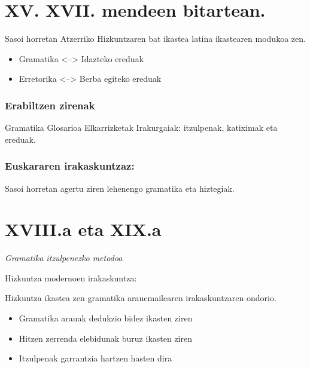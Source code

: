 \documentclass[
]{book}
\providecommand{\tightlist}{%
  \setlength{\itemsep}{0pt}\setlength{\parskip}{0pt}}
\begin{document}
\hypertarget{xv.-xvii.-mendeen-bitartean.}{%
\section{XV. XVII. mendeen bitartean.}\label{xv.-xvii.-mendeen-bitartean.}}

Sasoi horretan Atzerriko Hizkuntzaren bat ikastea latina ikastearen modukoa zen.

\begin{itemize}
\tightlist
\item
  Gramatika \textless--\textgreater{} Idazteko ereduak
\item
  Erretorika \textless--\textgreater{} Berba egiteko ereduak
\end{itemize}

\hypertarget{erabiltzen-zirenak}{%
\subsubsection{Erabiltzen zirenak}\label{erabiltzen-zirenak}}

Gramatika
Glosarioa
Elkarrizketak
Irakurgaiak: itzulpenak, katiximak eta ereduak.

\hypertarget{euskararen-irakaskuntzaz}{%
\subsubsection{Euskararen irakaskuntzaz:}\label{euskararen-irakaskuntzaz}}

Sasoi horretan agertu ziren lehenengo gramatika eta hiztegiak.

\hypertarget{xviii.a-eta-xix.a}{%
\section{XVIII.a eta XIX.a}\label{xviii.a-eta-xix.a}}

\emph{Gramatika itzulpenezko metodoa}

Hizkuntza modernoen irakaskuntza:

Hizkuntza ikastea zen gramatika arauemailearen irakaskuntzaren ondorio.

\begin{itemize}
\tightlist
\item
  Gramatika arauak dedukzio bidez ikasten ziren
\item
  Hitzen zerrenda elebidunak buruz ikasten ziren
\item
  Itzulpenak garrantzia hartzen hasten dira
\end{itemize}
\end{document}
